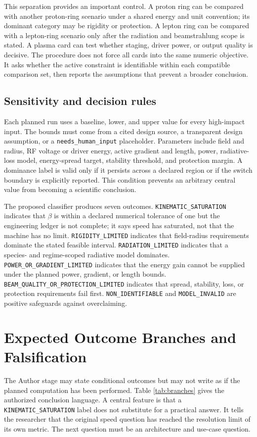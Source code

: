 \documentclass[conference]{../../../../Conference-LaTeX-template_10-17-19/IEEEtran}
\begin{document}
This separation provides an important control. A proton ring can be compared with another proton-ring scenario under a shared energy and unit convention; its dominant category may be rigidity or protection. A lepton ring can be compared with a lepton-ring scenario only after the radiation and beamstrahlung scope is stated. A plasma card can test whether staging, driver power, or output quality is decisive. The procedure does not force all cards into the same numeric objective. It asks whether the active constraint is identifiable within each compatible comparison set, then reports the assumptions that prevent a broader conclusion.

\subsection{Sensitivity and decision rules}
Each planned run uses a baseline, lower, and upper value for every high-impact input. The bounds must come from a cited design source, a transparent design assumption, or a \texttt{needs\_human\_input} placeholder. Parameters include field and radius, RF voltage or driver energy, active gradient and length, power, radiative-loss model, energy-spread target, stability threshold, and protection margin. A dominance label is valid only if it persists across a declared region or if the switch boundary is explicitly reported. This condition prevents an arbitrary central value from becoming a scientific conclusion.

The proposed classifier produces seven outcomes. \texttt{KINEMATIC\_SATURATION} indicates that $\beta$ is within a declared numerical tolerance of one but the engineering ledger is not complete; it says speed has saturated, not that the machine has no limit. \texttt{RIGIDITY\_LIMITED} indicates that field-radius requirements dominate the stated feasible interval. \texttt{RADIATION\_LIMITED} indicates that a species- and regime-scoped radiative model dominates. \texttt{POWER\_OR\_GRADIENT\_LIMITED} indicates that the energy gain cannot be supplied under the planned power, gradient, or length bounds. \texttt{BEAM\_QUALITY\_OR\_PROTECTION\_LIMITED} indicates that spread, stability, loss, or protection requirements fail first. \texttt{NON\_IDENTIFIABLE} and \texttt{MODEL\_INVALID} are positive safeguards against overclaiming.

\section{Expected Outcome Branches and Falsification}
The Author stage may state conditional outcomes but may not write as if the planned computation has been performed. Table \ref{tab:branches} gives the authorized conclusion language. A central feature is that a \texttt{KINEMATIC\_SATURATION} label does not substitute for a practical answer. It tells the researcher that the original speed question has reached the resolution limit of its own metric. The next question must be an architecture and use-case question.
\end{document}
